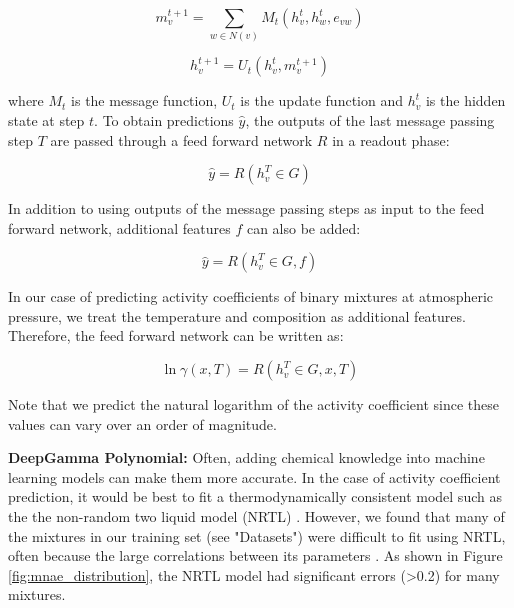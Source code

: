 \begin{equation}
    m_v^{t+1} = \sum_{w\in N(v)} M_t(h_v^t, h_w^t, e_{vw})
\end{equation}

\begin{equation}
    h_v^{t+1} = U_t(h_v^t, m_v^{t+1})
\end{equation}

where $M_t$ is the message function, $U_t$ is the update function and $h_v^{t}$ is the hidden state at step $t$. To obtain predictions $\hat y$, the outputs of the last message passing step $T$ are passed through a feed forward network $R$ in a readout phase:
 
\begin{equation}
    \hat y = R(h_v^T \in G)
\end{equation}

In addition to using outputs of the message passing steps as input to the feed forward network, additional features $f$ can also be added:

\begin{equation}
    \hat y = R(h_v^T \in G, f)
\end{equation}

In our case of predicting activity coefficients of binary mixtures at atmospheric pressure, we treat the temperature and composition as additional features. Therefore, the feed forward network can be written as:

\begin{equation}
   \ln \gamma(x,T)= R(h_v^T \in G, x, T)
\end{equation}

Note that we predict the natural logarithm of the activity coefficient since these values can vary over an order of magnitude.

\noindent
\textbf{DeepGamma Polynomial:} Often, adding chemical knowledge into machine learning models can make them more accurate. In the case of activity coefficient prediction, it would be best to fit a thermodynamically consistent model such as the the non-random two liquid model (NRTL) \cite{Renon1968}. However, we found that many of the mixtures in our training set (see "Datasets") were difficult to fit using NRTL, often because the large correlations between its parameters \cite{Holler2019}. As shown in Figure \ref{fig:mnae_distribution}, the NRTL model had significant errors (>0.2) for many mixtures.

